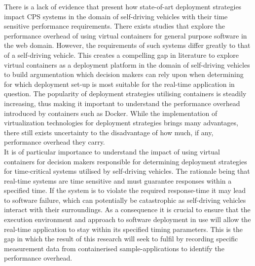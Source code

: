There is a lack of evidence that present how state-of-art deployment strategies impact CPS systems in the domain of self-driving vehicles with their time sensitive performance requirements. There exists studies that explore the performance overhead of using virtual containers for general purpose software in the web domain. However, the requirements of such systems differ greatly to that of a self-driving vehicle. This creates a compelling gap in literature to explore virtual containers as a deployment platform in the domain of self-driving vehicles to build argumentation which decision makers can rely upon when determining for which deployment set-up is most suitable for the real-time application in question. The popularity of deployment strategies utilising containers is steadily increasing, thus making it important to understand the performance overhead introduced by containers such as Docker. While the implementation of virtualization technologies for deployment strategies brings many advantages, there still exists uncertainty to the disadvantage of how much, if any, performance overhead they carry.\\

It is of particular importance to understand the impact of using virtual containers for decision makers responsible for determining deployment strategies for time-critical systems utilised by self-driving vehicles. The rationale being that real-time systems are time sensitive and must guarantee responses within a specified time. If the system is to violate the required response-time it may lead to software failure, which can potentially be catastrophic as self-driving vehicles interact with their surroundings. As a consequence it is crucial to ensure that the execution environment and approach to software deployment in use will allow the real-time application to stay within its specified timing parameters. This is the gap in which the result of this research will seek to fulfil by recording specific measurement data from containerised sample-applications to identify the performance overhead.\\

